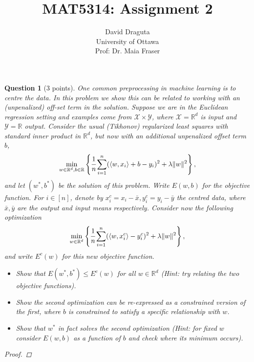 \documentclass[12pt]{article}
\newcommand{\real}{\mathbb{R}}
\newcommand{\norm}[1]{\lVert #1 \rVert}
\newcommand{\X}{\mathcal{X}}
\newcommand{\Y}{\mathcal{Y}}
\newtheorem{question}{Question}
\begin{document}
\title{MAT5314: Assignment 2}
\author{David Draguta
  \\University of Ottawa\\ Prof: Dr. Maia Fraser } 
 
\maketitle

\begin{question}[3 points]
  One common preprocessing in machine learning is to centre the data. In this problem we show this can be related to working with an (unpenalized) off-set term in the solution. Suppose we are in the Euclidean regression setting and examples come from $\X \times \Y$, where $\X=\real^d$ is input and $\Y=\real$ output. Consider the usual (Tikhonov) regularized least squares with standard inner product in $\real^d$, but now with an additional unpenalized offset term $b$,
  \begin{align*}
    \min\limits_{w \in \real^d, b \in \real}
    \left\{
    \cfrac{1}{n} \sum\limits_{i=1}^n(\langle w, x_i \rangle + b - y_i)^2 + \lambda\norm{w}^2
    \right\}
    ,
  \end{align*}
  and let $(w^*, b^*)$ be the solution of this problem. Write $E(w,b)$ for the objective function. For $i \in [n]$, denote by $x_i^c = x_i - \bar{x}, y_i^c = y_i - \bar{y}$ the centred data, where $\bar{x}, \bar{y}$ are the output and input means respectively. Consider now the following optimization
  \begin{align*}
    \min\limits_{w \in \real^d}
    \left\{
    \cfrac{1}{n} \sum\limits_{i=1}^n(\langle w, x_i^c \rangle - y_i^c)^2 + \lambda\norm{w}^2
    \right\}
    ,
  \end{align*}
  and write $E^c(w)$ for this new objective function.
  \begin{itemize}
  \item Show that $E(w^*, b^*) \leq E^c(w)$ for all $w \in \real^d$ (Hint: try relating the two objective functions).
  \item Show the second optimization can be re-expressed as a constrained version of the first, where $b$ is constrained to satisfy a specific relationship with $w$.
  \item Show that $w^*$ in fact solves the second optimization (Hint: for fixed $w$ consider $E(w,b)$ as a function of $b$ and check where its minimum occurs).
  \end{itemize}
  \begin{proof}

\end{proof}
\end{question}
\end{document}
